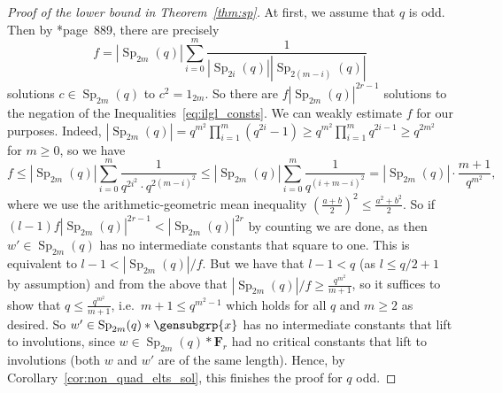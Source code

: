 \documentclass[a4paper,11pt]{amsproc}
\newcommand{\card}[1]{\left\lvert#1\right\rvert}%
\DeclareMathOperator{\Sp}{Sp}%
\newcommand{\freegrp}{\mathbf F}%
\theoremstyle{plain}
\theoremstyle{definition}
\begin{document}
\begin{proof}[Proof of the lower bound in Theorem~\ref{thm:sp}]
		At first, we assume that $q$ is odd. Then by \cite{fulmanguralnickstanton2017asymptotics}*{page~889}, there are precisely 
		$$
		f=\card{\Sp_{2m}(q)}\sum_{i=0}^m{\frac{1}{\card{\Sp_{2i}(q)}\card{\Sp_{2(m-i)}(q)}}}
		$$
		solutions $c\in\Sp_{2m}(q)$ to $c^2=1_{2m}$. So there are $f\card{\Sp_{2m}(q)}^{2r-1}$ solutions to the negation of the Inequalities~\eqref{eq:ilgl_consts}. 
		We can weakly estimate $f$ for our purposes. Indeed, $\card{\Sp_{2m}(q)}=q^{m^2}\prod_{i=1}^m{(q^{2i}-1)}\geq q^{m^2}\prod_{i=1}^m{q^{2i-1}}\geq q^{2m^2}$ for $m\geq0$, so we have
		$$
		f\leq\card{\Sp_{2m}(q)}\sum_{i=0}^m{\frac{1}{q^{2i^2}\cdot q^{2(m-i)^2}}}\leq\card{\Sp_{2m}(q)}\sum_{i=0}^m{\frac{1}{q^{(i+m-i)^2}}}
		=\card{\Sp_{2m}(q)}\cdot\frac{m+1}{q^{m^2}},
		$$
		where we use the arithmetic-geometric mean inequality $\left(\frac{a+b}{2}\right)^2\leq\frac{a^2+b^2}{2}$.
		So if $(l-1)f\card{\Sp_{2m}(q)}^{2r-1}<\card{\Sp_{2m}(q)}^{2r}$ by counting we are done, as then $w'\in\Sp_{2m}(q)$ has no intermediate constants that square to one. This is equivalent to
		$l-1<\card{\Sp_{2m}(q)}/f$. But we have that $l-1<q$ (as $l\leq q/2+1$ by assumption) and from the above that $\card{\Sp_{2m}(q)}/f\geq\frac{q^{m^2}}{m+1}$, so it suffices to show that $q\leq\frac{q^{m^2}}{m+1}$, i.e.\ $m+1\leq q^{m^2-1}$ which holds for all $q$ and $m\geq 2$ as desired. So $w'\in\Sp_{2m}(q)\ast\gensubgrp{x}$ has no intermediate constants that lift to involutions, since $w\in\Sp_{2m}(q)\ast\freegrp_r$ had no critical constants that lift to involutions (both $w$ and $w'$ are of the same length). Hence, by Corollary~\ref{cor:non_quad_elts_sol}, this finishes the proof for $q$ odd.
		

\end{proof}
\end{document}
